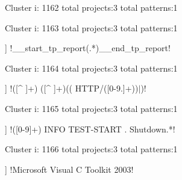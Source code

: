 Cluster i: 1162
total projects:3
total patterns:1
\begin{multicols}{1}
\end{multicols}







Cluster i: 1163
total projects:3
total patterns:1
\begin{multicols}{1}
\begin{description}[noitemsep,topsep=0pt]
\item [[3] ] \cverb!__start_tp_report(.*)__end_tp_report!
\end{description}
\end{multicols}







Cluster i: 1164
total projects:3
total patterns:1
\begin{multicols}{1}
\begin{description}[noitemsep,topsep=0pt]
\item [[3] ] \cverb!([^ ]+) ([^ ]+)(( HTTP/([0-9.]+))$|$)!
\end{description}
\end{multicols}







Cluster i: 1165
total projects:3
total patterns:1
\begin{multicols}{1}
\begin{description}[noitemsep,topsep=0pt]
\item [[3] ] \cverb!([0-9]+) INFO TEST-START . Shutdown.*!
\end{description}
\end{multicols}







Cluster i: 1166
total projects:3
total patterns:1
\begin{multicols}{1}
\begin{description}[noitemsep,topsep=0pt]
\item [[3] ] \cverb!Microsoft Visual C\+\+ Toolkit 2003!
\end{description}
\end{multicols}







